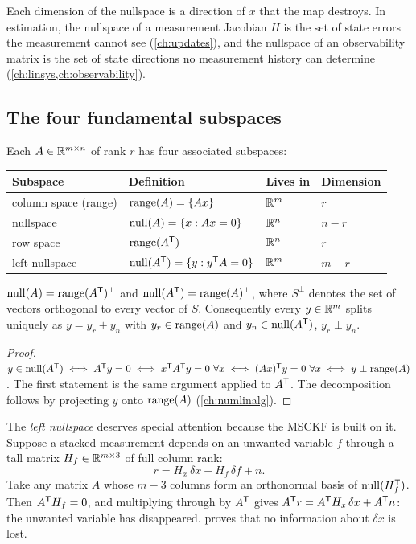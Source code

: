 Each dimension of the nullspace is a direction of $x$ that the map destroys. In estimation, the nullspace of a
measurement Jacobian $H$ is the set of state errors the measurement cannot see (\cref{ch:updates}), and the
nullspace of an observability matrix is the set of state directions no measurement history can determine
(\cref{ch:linsys,ch:observability}).

\subsection{The four fundamental subspaces}
\label{sec:subspaces}

Each $A \in \mathbb{R}^{m\times n}$ of rank $r$ has four associated subspaces:
\begin{center}
\begin{tabular}{@{}l l l l@{}}
\toprule
Subspace & Definition & Lives in & Dimension \\
\midrule
column space (range) & $\operatorname{range}(A) = \{Ax\}$ & $\mathbb{R}^m$ & $r$ \\
nullspace & $\operatorname{null}(A) = \{x : Ax = 0\}$ & $\mathbb{R}^n$ & $n - r$ \\
row space & $\operatorname{range}(A^{\mathsf{T}})$ & $\mathbb{R}^n$ & $r$ \\
left nullspace & $\operatorname{null}(A^{\mathsf{T}}) = \{y : y^{\mathsf{T}} A = 0\}$ & $\mathbb{R}^m$ & $m - r$ \\
\bottomrule
\end{tabular}
\end{center}

\begin{theorem}
\label{thm:fundamental}
$\operatorname{null}(A) = \operatorname{range}(A^{\mathsf{T}})^\perp$ and $\operatorname{null}(A^{\mathsf{T}}) = \operatorname{range}(A)^\perp$, where $S^\perp$ denotes the set of vectors orthogonal
to every vector of $S$. Consequently every $y \in \mathbb{R}^m$ splits uniquely as $y = y_r + y_n$ with $y_r \in \operatorname{range}(A)$ and
$y_n \in \operatorname{null}(A^{\mathsf{T}})$, $y_r \perp y_n$.
\end{theorem}
\begin{proof}
$y \in \operatorname{null}(A^{\mathsf{T}}) \iff A^{\mathsf{T}} y = 0 \iff x^{\mathsf{T}} A^{\mathsf{T}} y = 0\ \forall x \iff (Ax)^{\mathsf{T}} y = 0\ \forall x \iff y \perp \operatorname{range}(A)$. The
first statement is the same argument applied to $A^{\mathsf{T}}$. The decomposition follows by projecting $y$ onto $\operatorname{range}(A)$
(\cref{ch:numlinalg}).
\end{proof}

The \emph{left nullspace} deserves special attention because the MSCKF is built on it. Suppose a stacked measurement
depends on an unwanted variable $f$ through a tall matrix $H_f \in \mathbb{R}^{m\times3}$ of full column rank:
\begin{equation}
  r = H_x\,\delta x + H_f\,\delta f + n .
\end{equation}
Take any matrix $A$ whose $m - 3$ columns form an orthonormal basis of $\operatorname{null}(H_f^{\mathsf{T}})$. Then $A^{\mathsf{T}} H_f = 0$, and
multiplying through by $A^{\mathsf{T}}$ gives $A^{\mathsf{T}} r = A^{\mathsf{T}} H_x\,\delta x + A^{\mathsf{T}} n$: the unwanted variable has disappeared.
 proves that no information about $\delta x$ is lost.

